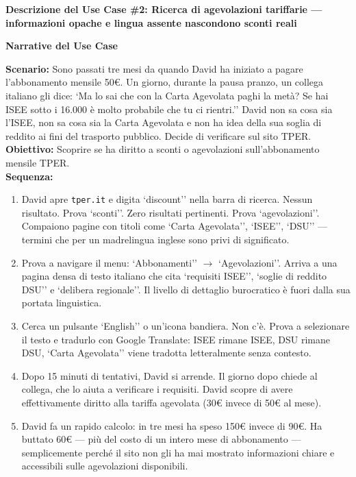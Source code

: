 \documentclass[11pt,a4paper]{article}
\begin{document}
\begin{tcolorbox}[colback=primaryColor!10,colframe=primaryColor,arc=2mm]
    \textbf{Descrizione del Use Case \#2: Ricerca di agevolazioni tariffarie --- informazioni opache e lingua assente nascondono sconti reali}
\end{tcolorbox}

\vspace{0.3cm}

\begin{tcolorbox}[colback=backgroundColor,colframe=borderColor,arc=2mm]
    \textbf{Narrative del Use Case} \\[4pt]
    {\small
    \textbf{Scenario:} Sono passati tre mesi da quando David ha iniziato a pagare l'abbonamento mensile 50\euro{}. Un giorno, durante la pausa pranzo, un collega italiano gli dice: `Ma lo sai che con la Carta Agevolata paghi la metà? Se hai ISEE sotto i 16.000 è molto probabile che tu ci rientri.'' David non sa cosa sia l'ISEE, non sa cosa sia la Carta Agevolata e non ha idea della sua soglia di reddito ai fini del trasporto pubblico. Decide di verificare sul sito TPER. \\[4pt]

    \textbf{Obiettivo:} Scoprire se ha diritto a sconti o agevolazioni sull'abbonamento mensile TPER. \\[4pt]

    \textbf{Sequenza:}
    \begin{enumerate}
        \item David apre \texttt{tper.it} e digita `discount'' nella barra di ricerca. Nessun risultato. Prova `sconti''. Zero risultati pertinenti. Prova `agevolazioni''. Compaiono pagine con titoli come `Carta Agevolata'', `ISEE'', `DSU'' --- termini che per un madrelingua inglese sono privi di significato.
        \item Prova a navigare il menu: `Abbonamenti'' $\rightarrow$ `Agevolazioni''. Arriva a una pagina densa di testo italiano che cita `requisiti ISEE'', `soglie di reddito DSU'' e `delibera regionale''. Il livello di dettaglio burocratico è fuori dalla sua portata linguistica.
        \item Cerca un pulsante `English'' o un'icona bandiera. Non c'è. Prova a selezionare il testo e tradurlo con Google Translate: ISEE rimane ISEE, DSU rimane DSU, `Carta Agevolata'' viene tradotta letteralmente senza contesto.
        \item Dopo 15 minuti di tentativi, David si arrende. Il giorno dopo chiede al collega, che lo aiuta a verificare i requisiti. David scopre di avere effettivamente diritto alla tariffa agevolata (30\euro{} invece di 50\euro{} al mese).
        \item David fa un rapido calcolo: in tre mesi ha speso 150\euro{} invece di 90\euro{}. Ha buttato 60\euro{} --- più del costo di un intero mese di abbonamento --- semplicemente perché il sito non gli ha mai mostrato informazioni chiare e accessibili sulle agevolazioni disponibili.
    \end{enumerate}

}
\end{tcolorbox}
\end{document}
